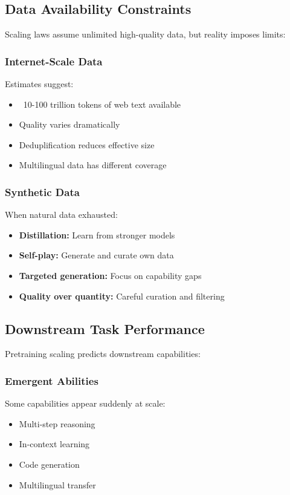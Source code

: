\documentclass[class=article,crop=false]{standalone}
\begin{document}
\subsection{Data Availability Constraints}
\label{sec:scaling:data}

Scaling laws assume unlimited high-quality data, but reality imposes limits:

\subsubsection{Internet-Scale Data}

Estimates suggest:
\begin{itemize}
  \item ~10-100 trillion tokens of web text available
  \item Quality varies dramatically
  \item Deduplification reduces effective size
  \item Multilingual data has different coverage
\end{itemize}

\subsubsection{Synthetic Data}

When natural data exhausted:
\begin{itemize}
  \item \textbf{Distillation:} Learn from stronger models
  \item \textbf{Self-play:} Generate and curate own data
  \item \textbf{Targeted generation:} Focus on capability gaps
  \item \textbf{Quality over quantity:} Careful curation and filtering
\end{itemize}

\subsection{Downstream Task Performance}
\label{sec:scaling:downstream}

Pretraining scaling predicts downstream capabilities:

\subsubsection{Emergent Abilities}

Some capabilities appear suddenly at scale:
\begin{itemize}
  \item Multi-step reasoning
  \item In-context learning
  \item Code generation
  \item Multilingual transfer
\end{itemize}
\end{document}
